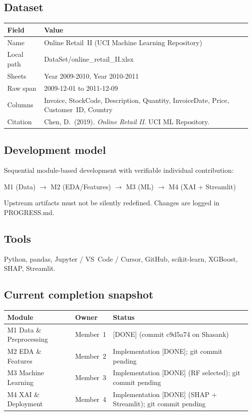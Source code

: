 \documentclass[11pt,a4paper]{article}
\newcommand{\done}{[DONE]}
\renewcommand{\texttt}[1]{#1}
\begin{document}
\subsection{Dataset}
\begin{tabular}{|p{}|p{}|}
\hline
\textbf{Field} & \textbf{Value} \\
\hline
Name & Online Retail~II (UCI Machine Learning Repository) \\
\hline
Local path & \texttt{DataSet/online\_retail\_II.xlsx} \\
\hline
Sheets & \texttt{Year 2009-2010}, \texttt{Year 2010-2011} \\
\hline
Raw span & 2009-12-01 to 2011-12-09 \\
\hline
Columns & Invoice, StockCode, Description, Quantity, InvoiceDate, Price, Customer~ID, Country \\
\hline
Citation & Chen, D.\ (2019). \textit{Online Retail II}. UCI ML Repository. \\
\hline
\end{tabular}

\subsection{Development model}
Sequential module-based development with verifiable individual contribution:

\begin{center}
\texttt{M1 (Data)} $\rightarrow$ \texttt{M2 (EDA/Features)} $\rightarrow$
\texttt{M3 (ML)} $\rightarrow$ \texttt{M4 (XAI + Streamlit)}
\end{center}

Upstream artifacts must not be silently redefined. Changes are logged in
\texttt{PROGRESS.md}.

\subsection{Tools}
Python, pandas, Jupyter / VS~Code / Cursor, GitHub, scikit-learn, XGBoost,
SHAP, Streamlit.

\subsection{Current completion snapshot}
\begin{tabular}{|l|l|p{}|}
\hline
\textbf{Module} & \textbf{Owner} & \textbf{Status} \\
\hline
M1 Data \& Preprocessing & Member~1 & \done{} (commit \texttt{c9d5a74} on \texttt{Shasank}) \\
\hline
M2 EDA \& Features & Member~2 & Implementation \done{}; git commit pending \\
\hline
M3 Machine Learning & Member~3 & Implementation \done{} (RF selected); git commit pending \\
\hline
M4 XAI \& Deployment & Member~4 & Implementation \done{} (SHAP + Streamlit); git commit pending \\
\hline
\end{tabular}
\end{document}
